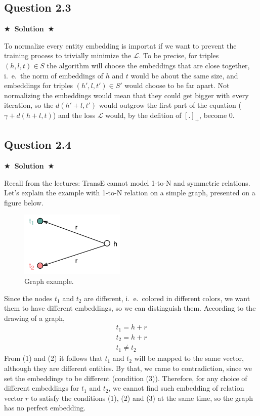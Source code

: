 \documentclass{article}
\newcommand{\Solution}[1]{{\medskip \color{black} \bf $\bigstar$~\sf \textbf{Solution}~$\bigstar$ \sf #1 } \bigskip}
\begin{document}

\subsection*{Question 2.3}
\Solution{

  \noindent
  To normalize every entity embedding is importat if we want to prevent the training process to trivially minimize the $\mathcal{L}$.
  To be precise, for triples $(h, l, t) \in S$ the algorithm will choose the embeddings that are close together, 
  i.~e.~the norm of embeddings of $h$ and $t$ would be about the same size, and embeddings for triples $(h', l, t') \in S'$ would choose to be far apart.
  Not normalizing the embeddings would mean that they could get bigger with every iteration, so the $d(h' + l, t')$ would outgrow the first part of the equation ($\gamma + d(h+ l, t)$)
  and the loss $\mathcal{L}$ would, by the defition of $[.]_+$, become 0.
}





\subsection*{Question 2.4}
\Solution{

  \noindent
  Recall from the lectures: TransE cannot model 1-to-N and symmetric relations. 
  \\
  Let's explain the example with 1-to-N relation on a simple graph, presented on a figure below.
  \begin{figure}[ht!]
    \centering
    \includegraphics[width=50mm]{Slike/2_4.png}
    \caption{Graph example.}
  \end{figure}
  Since the nodes $t_1$ and $t_2$ are different, i.~e.~colored in different colors, we want them to have different embeddings, so we can distinguish them.
  According to the drawing of a graph, 
  \begin{align}
    t_1 = h + r
    \\
    t_2 = h + r
    \\
    t_1 \neq t_2
  \end{align}
  From (1) and (2) it follows that $t_1$ and $t_2$ will be mapped to the same vector, although they are different entities. 
  By that, we came to contradiction, since we set the embeddings to be different (condition (3)).
  Therefore, for any choice of different embeddings for $t_1$ and $t_2$, we cannot find such embedding of relation vector $r$ to satisfy the conditions (1), (2) and (3) at the same time,
  so the graph has no perfect embedding.

}
\end{document}

